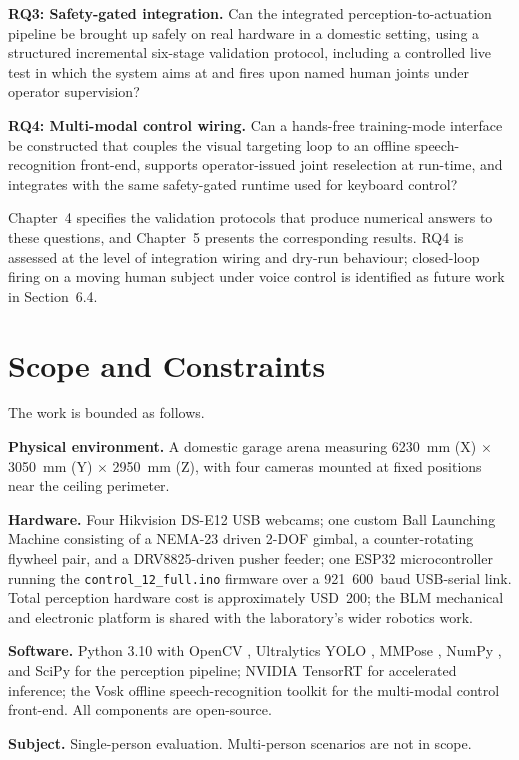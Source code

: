 \textbf{RQ3: Safety-gated integration.} Can the integrated perception-to-actuation pipeline be brought up safely on real hardware in a domestic setting, using a structured incremental six-stage validation protocol, including a controlled live test in which the system aims at and fires upon named human joints under operator supervision?

\textbf{RQ4: Multi-modal control wiring.} Can a hands-free training-mode interface be constructed that couples the visual targeting loop to an offline speech-recognition front-end, supports operator-issued joint reselection at run-time, and integrates with the same safety-gated runtime used for keyboard control?

Chapter~4 specifies the validation protocols that produce numerical answers to these questions, and Chapter~5 presents the corresponding results. RQ4 is assessed at the level of integration wiring and dry-run behaviour; closed-loop firing on a moving human subject under voice control is identified as future work in Section~6.4.

\section{Scope and Constraints}

The work is bounded as follows.

\textbf{Physical environment.} A domestic garage arena measuring 6230~mm (X) $\times$ 3050~mm (Y) $\times$ 2950~mm (Z), with four cameras mounted at fixed positions near the ceiling perimeter.

\textbf{Hardware.} Four Hikvision DS-E12 USB webcams; one custom Ball Launching Machine consisting of a NEMA-23 driven 2-DOF gimbal, a counter-rotating flywheel pair, and a DRV8825-driven pusher feeder; one ESP32 microcontroller running the \texttt{control\_12\_full.ino} firmware over a 921~600~baud USB-serial link. Total perception hardware cost is approximately USD~200; the BLM mechanical and electronic platform is shared with the laboratory's wider robotics work.

\textbf{Software.} Python 3.10 with OpenCV \cite{ref27}, Ultralytics YOLO \cite{ref14}, MMPose \cite{ref17}, NumPy \cite{ref28}, and SciPy \cite{ref29} for the perception pipeline; NVIDIA TensorRT \cite{ref38_tensorrt} for accelerated inference; the Vosk offline speech-recognition toolkit \cite{ref41_vosk} for the multi-modal control front-end. All components are open-source.

\textbf{Subject.} Single-person evaluation. Multi-person scenarios are not in scope.

